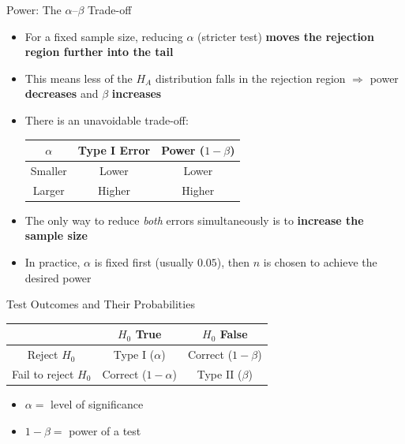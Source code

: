 \documentclass[12pt, aspectratio=169]{beamer}
\begin{document}
    \begin{frame}{Power: The $\alpha$--$\beta$ Trade-off}
        \begin{itemize}
            \item For a fixed sample size, reducing $\alpha$ (stricter test)
                \textbf{moves the rejection region further into the tail}
            \item This means less of the $H_A$ distribution falls in the rejection region
                $\Rightarrow$ power \textbf{decreases} and $\beta$ \textbf{increases}
            \item There is an unavoidable trade-off:
            \begin{center}
                \begin{tabular}{ccc}
                    \toprule
                    $\alpha$ & Type I Error & Power ($1-\beta$) \\
                    \midrule
                    Smaller & Lower  & Lower \\
                    Larger  & Higher & Higher \\
                    \bottomrule
                \end{tabular}
            \end{center}
            \item The only way to reduce \emph{both} errors simultaneously is to
                \textbf{increase the sample size}
            \item In practice, $\alpha$ is fixed first (usually $0.05$),
                then $n$ is chosen to achieve the desired power
        \end{itemize}
    \end{frame}


    \begin{frame}{Test Outcomes and Their Probabilities}
        \begin{center}
            \begin{tabular}{c|cc}
                \hline
                & $H_0$ True & $H_0$ False \\
                \hline
                Reject $H_0$ & Type I ($\alpha$) & Correct ($1-\beta$) \\
                Fail to reject $H_0$ & Correct ($1-\alpha$) & Type II ($\beta$) \\
                \hline
            \end{tabular}
        \end{center}

        \begin{itemize}
            \item \(\alpha = \) level of significance
            \item \(1 - \beta = \) power of a test
        \end{itemize}
    \end{frame}
\end{document}

